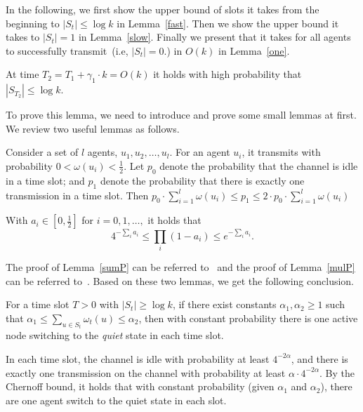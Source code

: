 In the following, we first show the
upper bound of slots it takes from the beginning to $|S_t| \leq \log k$ in Lemma~\ref{fast}.
Then we show the upper bound it takes to $|S_t| = 1$ in Lemma~\ref{slow}.
Finally we present that it takes for all agents to successfully transmit~(i.e, $|S_t| = 0$.) in $O(k)$ 
in Lemma~\ref{one}. 

\begin{lemma}
    \label{fast}
    At time $T_2=T_1 + \gamma_1\cdot k  =O(k)$ 
    it holds with high probability that $|S_{T_2}| \leq \log k$. 
\end{lemma}

To prove this lemma, we need to introduce and prove some small lemmas at first.
We review two useful lemmas as follows.
\begin{lemma}
    \label{sumP}
    Consider a set of $l$ agents, $u_1, u_2,\dots, u_l$.
    For an agent $u_i$, it transmits with probability 
    $0 < \omega(u_i) < \frac{1}{2}$. Let $p_0$ denote the 
    probability that the channel is idle in a time slot; and $p_1$ denote 
    the probability that there is exactly one transmission in a time slot.
    Then $p_0\cdot {\sum}_{i=1}^{l}\omega(u_i)\leq p_1 \leq
    2\cdot p_0\cdot {\sum}_{i=1}^{l}\omega(u_i)$     
\end{lemma}
\begin{lemma}
    \label{mulP}
    With $a_i \in [0, \frac{1}{2}]$ for $i = 0,1,\dots,$ it holds that
    \begin{equation}
        \label{mul}
        4^{-{\sum}_{i}a_i}\leq {\prod}_{i}(1-a_i)\leq e^{-{\sum}_{i}a_i}. 
    \end{equation}
\end{lemma}
The proof of Lemma~\ref{sumP} can be referred to~\cite{Richa2010A}
and the proof of Lemma~\ref{mulP} can be referred to~\cite{Daum2013Maximal}.
Based on these two lemmas, we get the following conclusion.

\begin{lemma}
    \label{safe}
    For a time slot $T>0$ with $|S_t| \ge \log k$, if 
    there exist constants $\alpha_1, \alpha_2 \ge 1$ such that
    $\alpha_1 \leq \sum_{u\in S_t}{\omega}_t(u) \leq \alpha_2$, then with constant probability 
    there is one active node switching to the \emph{quiet} state
    in each time slot. 
\end{lemma}
\begin{IEEEproof}
    In each time slot, the channel is idle with probability at least 
    $4^{-2\alpha}$, and there is exactly one transmission on the channel
    with probability at least $\alpha\cdot 4^{-2\alpha}$. By the Chernoff
    bound, it holds that with constant probability (given $\alpha_1$ and $\alpha_2$),
    there are one agent switch to the quiet state in each slot.
\end{IEEEproof}

